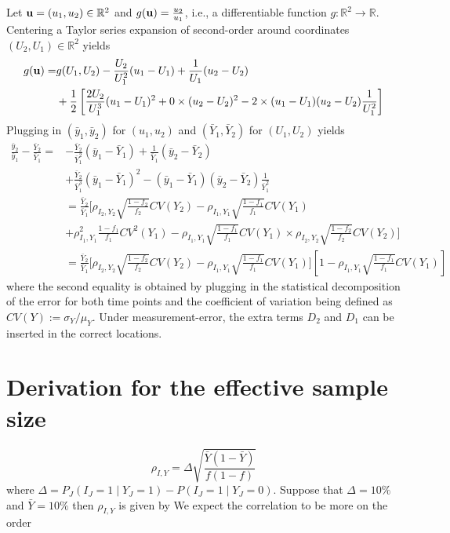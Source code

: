 \documentclass[aoas]{amsart}
\begin{document}
Let ${\bf u} = (u_1,u_2) \in \mathbb{R}^2$ and $g({\bf u}) = \frac{u_2}{u_1}$, i.e., a differentiable function $g:\mathbb{R}^2 \to \mathbb{R}$. Centering a Taylor series expansion of second-order around coordinates $(U_2, U_1) \in \mathbb{R}^2$ yields
$$
\begin{aligned}
g({\bf u}) =& g(U_1, U_2) - \frac{U_2}{U_1^2} (u_1 - U_1) + \frac{1}{U_1} (u_2 - U_2) \\
&+ \frac{1}{2} \left[ \frac{2 U_2}{U_1^3} (u_1 - U_1)^2 + 0 \times (u_2 - U_2)^2 - 2 \times (u_1 - U_1) (u_2 - U_2) \frac{1}{U_1^2} \right]
\end{aligned}
$$
Plugging in $(\bar y_1, \bar y_2)$ for $(u_1, u_2)$ and $(\bar Y_1, \bar Y_2)$ for $(U_1, U_2)$ yields
$$
\begin{aligned}
\frac{\bar y_2}{\bar y_1} - \frac{\bar Y_2}{\bar Y_1} =& - \frac{\bar Y_2}{\bar Y_1^2} (\bar y_1 - \bar Y_1) + \frac{1}{\bar Y_1} (\bar y_2 - \bar Y_2) \\
&+ \frac{\bar Y_2}{\bar Y_1^3} (\bar y_1 - \bar Y_1)^2 -  (\bar y_1 - \bar Y_1) (\bar y_2 - \bar Y_2) \frac{1}{\bar Y_1^2} \\
&= \frac{\bar Y_2}{\bar Y_1} \bigg[  \rho_{I_2,Y_2} \sqrt{\frac{1-f_2}{f_2}} CV (Y_2)  -\rho_{I_1,Y_1} \sqrt{\frac{1-f_1}{f_1}} CV (Y_1) \\
&+ \rho^2_{I_1,Y_1} \frac{1-f_1}{f_1} CV^2 (Y_1) -  \rho_{I_1,Y_1} \sqrt{\frac{1-f_1}{f_1}} CV (Y_1) \times \rho_{I_2,Y_2} \sqrt{\frac{1-f_2}{f_2}} CV (Y_2)   \bigg] \\
&= \frac{\bar Y_2}{\bar Y_1} \bigg[ \rho_{I_2,Y_2} \sqrt{\frac{1-f_2}{f_2}} CV (Y_2)  -\rho_{I_1,Y_1} \sqrt{\frac{1-f_1}{f_1}} CV (Y_1) \bigg] \left[ 1 - \rho_{I_1,Y_1} \sqrt{\frac{1-f_1}{f_1}} CV (Y_1) \right]
\end{aligned}
$$
where the second equality is obtained by plugging in the statistical decomposition of the error for both time points and the coefficient of variation being defined as $CV(Y) := \sigma_Y/\mu_Y$.  Under measurement-error, the extra terms $D_{2}$ and $D_1$ can be inserted in the correct locations.

\section{Derivation for the effective sample size}

\begin{equation} \label{eq:binaryrho}
\rho_{I,Y} = \Delta \sqrt{\frac{\bar Y (1 - \bar Y)}{f (1-f)} }
\end{equation}
where $\Delta = P_J (I_J = 1 \mid Y_J = 1) - P(I_J = 1 \mid Y_J = 0)$.  Suppose that $\Delta = 10\%$ and $\bar Y = 10\%$ then $\rho_{I,Y}$ is given by
We expect the correlation to be more on the order
\end{document}
